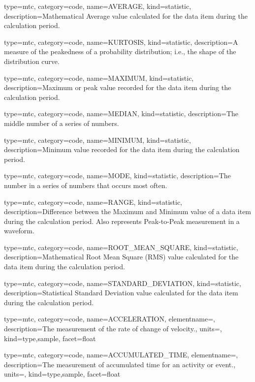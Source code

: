 {
  type=mtc,
  category=code,
  name={AVERAGE},
  kind={statistic},
  description={Mathematical Average value calculated for the data item during the calculation period.}
}


{
  type=mtc,
  category=code,
  name={KURTOSIS},
  kind={statistic},
  description={A measure of the peakedness of a probability distribution; i.e., the shape of the distribution curve.}
}


{
  type=mtc,
  category=code,
  name={MAXIMUM},
  kind={statistic},
  description={Maximum or peak value recorded for the data item during the calculation period.}
}


{
  type=mtc,
  category=code,
  name={MEDIAN},
  kind={statistic},
  description={The middle number of a series of numbers.}
}


{
  type=mtc,
  category=code,
  name={MINIMUM},
  kind={statistic},
  description={Minimum value recorded for the data item during the calculation period.}
}


{
  type=mtc,
  category=code,
  name={MODE},
  kind={statistic},
  description={The number in a series of numbers that occurs most often.}
}


{
  type=mtc,
  category=code,
  name={RANGE},
  kind={statistic},
  description={Difference between the Maximum and Minimum value of a data item during the calculation period.  Also represents Peak-to-Peak measurement in a waveform.}
}


{
  type=mtc,
  category=code,
  name={ROOT\_MEAN\_SQUARE},
  kind={statistic},
  description={Mathematical Root Mean Square (RMS) value calculated for the data item during the calculation period.}
}


{
  type=mtc,
  category=code,
  name={STANDARD\_DEVIATION},
  kind={statistic},
  description={Statistical Standard Deviation value calculated for the data item during the calculation period.}
}


{
  type=mtc,
  category=code,
  name={ACCELERATION},
  elementname=,
  description={The measurement of the rate of change of velocity.},
  units=,
  kind={type,sample},
  facet={\gls{float}}
}


{
  type=mtc,
  category=code,
  name={ACCUMULATED\_TIME},
  elementname=,
  description={The measurement of accumulated time for an activity or event.},
  units=,
  kind={type,sample},
  facet={\gls{float}}
}


